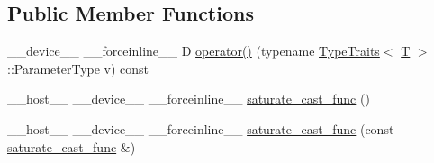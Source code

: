 \subsection*{Public Member Functions}
\begin{DoxyCompactItemize}
\item 
\-\_\-\-\_\-device\-\_\-\-\_\- \-\_\-\-\_\-forceinline\-\_\-\-\_\- D \hyperlink{structcv_1_1gpu_1_1device_1_1saturate__cast__func_a44a204ec51aaf91349f5f968486aaac0}{operator()} (typename \hyperlink{structcv_1_1gpu_1_1device_1_1TypeTraits}{Type\-Traits}$<$ \hyperlink{calib3d_8hpp_a3efb9551a871ddd0463079a808916717}{T} $>$\-::Parameter\-Type v) const 
\item 
\-\_\-\-\_\-host\-\_\-\-\_\- \-\_\-\-\_\-device\-\_\-\-\_\- \-\_\-\-\_\-forceinline\-\_\-\-\_\- \hyperlink{structcv_1_1gpu_1_1device_1_1saturate__cast__func_a2d2291f7c0f39db6ddef7785542f7747}{saturate\-\_\-cast\-\_\-func} ()
\item 
\-\_\-\-\_\-host\-\_\-\-\_\- \-\_\-\-\_\-device\-\_\-\-\_\- \-\_\-\-\_\-forceinline\-\_\-\-\_\- \hyperlink{structcv_1_1gpu_1_1device_1_1saturate__cast__func_aae419dbf46af679aef32a04c41473927}{saturate\-\_\-cast\-\_\-func} (const \hyperlink{structcv_1_1gpu_1_1device_1_1saturate__cast__func}{saturate\-\_\-cast\-\_\-func} \&)
\end{DoxyCompactItemize}


